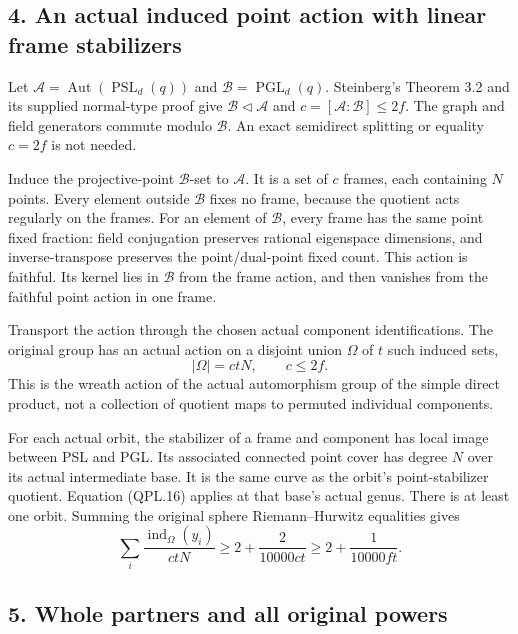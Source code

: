 \subsection*{4. An actual induced point action with linear frame stabilizers}

Let
\(\mathcal A=\operatorname{Aut}(\operatorname{PSL}_d(q))\)
and \(\mathcal B=\operatorname{PGL}_d(q)\).
Steinberg's Theorem 3.2 and its supplied normal-type proof
\cite[Sections 3--6]{PFL:Steinberg1960} give
\(\mathcal B\triangleleft\mathcal A\) and
\(c=[\mathcal A:\mathcal B]\le2f\).
The graph and field generators commute modulo \(\mathcal B\).
An exact semidirect splitting or equality \(c=2f\) is not needed.

Induce the projective-point \(\mathcal B\)-set to \(\mathcal A\).
It is a set of \(c\) frames, each containing \(N\) points.
Every element outside \(\mathcal B\) fixes no frame, because
the quotient acts regularly on the frames.
For an element of \(\mathcal B\), every frame has the same
point fixed fraction: field conjugation preserves rational
eigenspace dimensions, and inverse-transpose preserves the
point/dual-point fixed count.
This action is faithful. Its kernel lies in \(\mathcal B\)
from the frame action, and then vanishes from the faithful
point action in one frame.

Transport the action through the chosen actual component
identifications. The original group has an actual action on
a disjoint union \(\Omega\) of \(t\) such induced sets,
\[
          |\Omega|=ctN,\qquad c\le2f.
 \tag{QPL.21}
\]
This is the wreath action of the actual automorphism group
of the simple direct product, not a collection of quotient
maps to permuted individual components.

For each actual orbit, the stabilizer of a frame and component
has local image between PSL and PGL. Its associated connected
point cover has degree \(N\) over its actual intermediate base.
It is the same curve as the orbit's point-stabilizer quotient.
Equation (QPL.16) applies at that base's actual genus.
There is at least one orbit. Summing the original sphere
Riemann--Hurwitz equalities gives
\[
 \sum_i\frac{\operatorname{ind}_\Omega(y_i)}{ctN}
             \ge2+\frac2{10000ct}
             \ge2+\frac1{10000ft}.
 \tag{QPL.22}
\]

\subsection*{5. Whole partners and all original powers}

